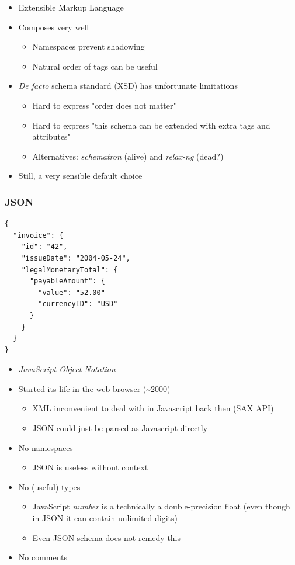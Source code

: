 \documentclass[8pt]{article}
\begin{document}
\begin{itemize}
\item Extensible Markup Language
\item Composes very well
\begin{itemize}
\item Namespaces prevent shadowing
\item Natural order of tags can be useful
\end{itemize}
\item \emph{De facto} schema standard (XSD) has unfortunate limitations
\begin{itemize}
\item Hard to express "order does not matter"
\item Hard to express "this schema can be extended with extra tags and attributes"
\item Alternatives: \emph{schematron} (alive) and \emph{relax-ng} (dead?)
\end{itemize}
\item Still, a very sensible default choice
\end{itemize}
\subsubsection{JSON}
\label{sec:org200d515}
\begin{verbatim}
{
  "invoice": {
    "id": "42",
    "issueDate": "2004-05-24",
    "legalMonetaryTotal": {
      "payableAmount": {
        "value": "52.00"
        "currencyID": "USD"
      }
    }
  }
}
\end{verbatim}
\begin{itemize}
\item \emph{JavaScript Object Notation}
\item Started its life in the web browser (\textasciitilde{}2000)
\begin{itemize}
\item XML inconvenient to deal with in Javascript back then (SAX API)
\item JSON could just be parsed as Javascript directly
\end{itemize}
\item No namespaces
\begin{itemize}
\item JSON is useless without context
\end{itemize}
\item No (useful) types
\begin{itemize}
\item JavaScript \emph{number} is a technically a double-precision float (even though in JSON it can contain unlimited digits)
\item Even \href{https://json-schema.org/understanding-json-schema/reference/numeric.html}{JSON schema} does not remedy this
\end{itemize}
\item No comments
\end{itemize}
\end{document}
